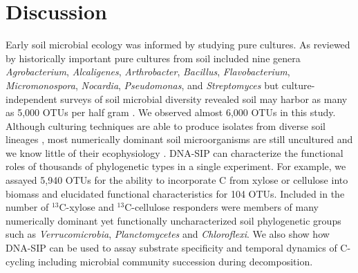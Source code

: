 \section{Discussion}
Early soil microbial ecology was informed by studying pure cultures.  As
reviewed by \citet{Janssen2006} historically important pure cultures from soil
included nine genera \textit{Agrobacterium}, \textit{Alcaligenes},
\textit{Arthrobacter}, \textit{Bacillus}, \textit{Flavobacterium},
\textit{Micromonospora}, \textit{Nocardia}, \textit{Pseudomonas}, and
\textit{Streptomyces} but culture-independent surveys of soil microbial
diversity revealed soil may harbor as many as 5,000 OTUs per half gram
\citep{Schloss2006}. We observed almost 6,000 OTUs in this study. Although
culturing techniques are able to produce isolates from diverse soil lineages
\citep{Janssen2002}, most numerically dominant soil microorganisms are still
uncultured and we know little of their ecophysiology \citep{Janssen2006}. DNA-SIP can characterize the
functional roles of thousands of phylogenetic types in a single experiment. For
example, we assayed 5,940 OTUs for the ability to incorporate C from xylose or
cellulose into biomass and elucidated functional characteristics for 104 OTUs.
Included in the number of $^{13}$C-xylose and $^{13}$C-cellulose responders
were members of many numerically dominant yet functionally uncharacterized soil
phylogenetic groups such as \textit{Verrucomicrobia}, \textit{Planctomycetes}
and \textit{Chloroflexi}. We also show how DNA-SIP can be used to assay
substrate specificity and temporal dynamics of C-cycling including microbial
community succession during decomposition.

